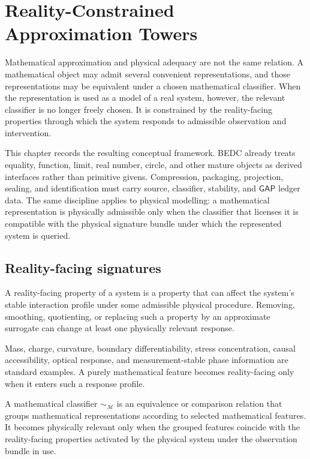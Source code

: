 \chapter{Reality-Constrained Approximation Towers}
\label{ch:visions-reality-constrained-approximation-towers}

Mathematical approximation and physical adequacy are not the same relation. A mathematical object may admit several convenient representations, and those representations may be equivalent under a chosen mathematical classifier. When the representation is used as a model of a real system, however, the relevant classifier is no longer freely chosen. It is constrained by the reality-facing properties through which the system responds to admissible observation and intervention.

This chapter records the resulting conceptual framework. BEDC already treats equality, function, limit, real number, circle, and other mature objects as derived interfaces rather than primitive givens. Compression, packaging, projection, sealing, and identification must carry source, classifier, stability, and $\mathsf{GAP}$ ledger data. The same discipline applies to physical modelling: a mathematical representation is physically admissible only when the classifier that licenses it is compatible with the physical signature bundle under which the represented system is queried.

\section{Reality-facing signatures}
\label{sec:reality-constrained-signatures}

\begin{definition}
\label{def:reality-facing-property}
A reality-facing property of a system is a property that can affect the system's stable interaction profile under some admissible physical procedure. Removing, smoothing, quotienting, or replacing such a property by an approximate surrogate can change at least one physically relevant response.
\end{definition}

Mass, charge, curvature, boundary differentiability, stress concentration, causal accessibility, optical response, and measurement-stable phase information are standard examples. A purely mathematical feature becomes reality-facing only when it enters such a response profile.

\begin{definition}
\label{def:reality-constrained-mathematical-classifier}
A mathematical classifier $\sim_{\mathcal M}$ is an equivalence or comparison relation that groups mathematical representations according to selected mathematical features. It becomes physically relevant only when the grouped features coincide with the reality-facing properties activated by the physical system under the observation bundle in use.
\end{definition}

